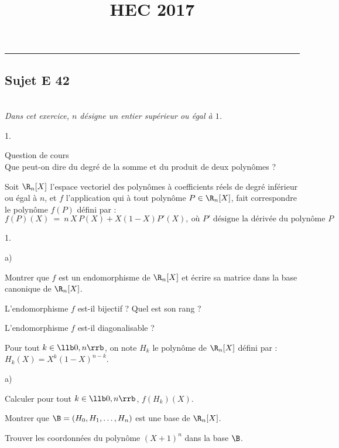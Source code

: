 \documentclass[11pt]{article}%
\title{\bf \vspace{-1.6cm} HEC 2017} %
\author{} %
\date{} %
\begin{document}
\maketitle %
\vspace{-1.2cm}\hrule %
\thispagestyle{fancy}

\vspace*{.2cm}


\subsection*{Sujet E 42}


\begin{exerciceAP}~\\
  {\it Dans cet exercice, $n$ désigne un entier supérieur ou égal à
    $1$.}
  \begin{noliste}{1.}
    \setlength{\itemsep}{2mm}
  \item Question de cours\\
    Que peut-on dire du degré de la somme et du produit de deux
    polynômes ?
  \end{noliste}  
  Soit $\R_n[X]$ l'espace vectoriel des polynômes à coefficients réels
  de degré inférieur ou égal à $n$, et $f$ l'application qui à tout
  polynôme $P\in \R_n[X]$, fait correspondre le polynôme $f(P)$ défini
  par :
  \[
  f(P)(X) \ = \ n \, X \, P(X) + X(1-X)P'(X), \ \text{où $P'$ désigne
    la dérivée du polynôme $P$}
  \]
  \begin{noliste}{1.}
    \setlength{\itemsep}{2mm}
    \setcounter{enumi}{1}
  \item 
    \begin{noliste}{a)}
    \item Montrer que $f$ est un endomorphisme de $\R_n[X]$ et écrire
      sa matrice dans la base canonique de $\R_n[X]$.
      
    \item L'endomorphisme $f$ est-il bijectif ? Quel est son rang ?
      
    \item L'endomorphisme $f$ est-il diagonalisable ?
    \end{noliste}
    
  \item Pour tout $k \in \llb 0,n \rrb$, on note $H_k$ le 
    polynôme de $\R_n[X]$ défini par : $H_k(X) = X^k(1-X)^{n-k}$.
    \begin{noliste}{a)}
    \setlength{\itemsep}{2mm}
    \item Calculer pour tout $k \in \llb 0, n \rrb$, $f(H_k)(X)$.
      
    \item Montrer que $\B=(H_0,H_1, \ldots, H_n)$ est une base de
      $\R_n[X]$.
      
    \item Trouver les coordonnées du polynôme $(X+1)^n$ dans la base
      $\B$.
    \end{noliste}
  \end{noliste}
\end{exerciceAP}
\end{document}
